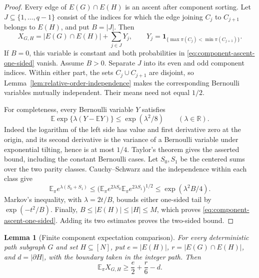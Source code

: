 \documentclass[11pt]{article}
\numberwithin{equation}{section}
\newtheorem{lemma}[lemma]{Lemma}
\newcommand{\E}{\mathbb E}
\newcommand{\1}{\mathbf 1}
\begin{document}
\begin{proof}
Every edge of \(E(G)\cap E(H)\) is an ascent after component
sorting.  Let \(J\subseteq\{1,\ldots,q-1\}\) consist of the
indices for which the edge joining \(C_j\) to \(C_{j+1}\) belongs
to \(E(H)\), and put \(B=|J|\).  Then
\[
  X_{G,H}=|E(G)\cap E(H)|+\sum_{j\in J}Y_j,
  \qquad
  Y_j=\1_{\{\max\pi(C_j)<\min\pi(C_{j+1})\}}.
\]
If \(B=0\), this variable is constant and both probabilities in
\eqref{eq:component-ascent-one-sided} vanish.  Assume \(B>0\).
Separate \(J\) into its even and odd component indices.  Within
either part, the sets \(C_j\cup C_{j+1}\) are disjoint, so
Lemma~\ref{lem:relative-order-independence} makes the corresponding
Bernoulli variables mutually independent.  Their means need not equal
\(1/2\).

For completeness, every Bernoulli variable \(Y\) satisfies
\[
  \E\exp\{\lambda(Y-\E Y)\}\le\exp(\lambda^2/8)
  \qquad(\lambda\in\mathbb R).
\]
Indeed the logarithm of the left side has value and first derivative
zero at the origin, and its second derivative is the variance of a
Bernoulli variable under exponential tilting, hence is at most \(1/4\).
Taylor's theorem gives the asserted bound, including the constant
Bernoulli cases.  Let \(S_0,S_1\) be the centered sums over the two
parity classes.  Cauchy--Schwarz and the independence within each class
give
\[
  \E_\pi e^{\lambda(S_0+S_1)}
  \le
  \bigl(\E_\pi e^{2\lambda S_0}
        \E_\pi e^{2\lambda S_1}\bigr)^{1/2}
  \le \exp(\lambda^2B/4).
\]
Markov's inequality, with \(\lambda=2t/B\), bounds either one-sided
tail by \(\exp(-t^2/B)\).  Finally,
\(B\le|E(H)|\le|H|\le M\), which proves
\eqref{eq:component-ascent-one-sided}.  Adding its two estimates proves
the two-sided bound.
\end{proof}

\begin{lemma}[Finite component expectation comparison]
\label{lem:component-ascent-expectation}
For every deterministic path subgraph \(G\) and set \(H\subseteq[N]\),
put \(e=|E(H)|\), \(r=|E(G)\cap E(H)|\), and
\(d=|\partial H|\), with the boundary taken in the integer path.
Then
\begin{equation}
\label{eq:component-ascent-expectation}
  \E_\pi X_{G,H}\ge \frac e2+\frac r6-d.
\end{equation}
\end{lemma}
\end{document}
